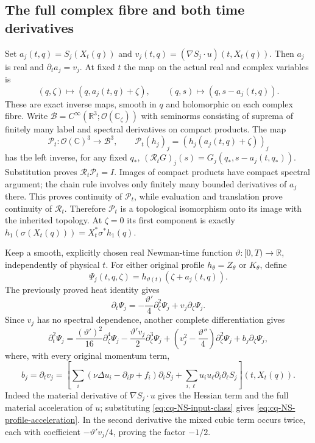 \subsection{The full complex fibre and both time derivatives}

Set $a_j(t,q)=S_j(X_t(q))$ and
$v_j(t,q)=(\nabla S_j\cdot u)(t,X_t(q))$.
Then $a_j$ is real and $\partial_ta_j=v_j$.
At fixed $t$ the map on the actual real and complex variables is
\[
 (q,\zeta)\longmapsto(q,a_j(t,q)+\zeta),\qquad
 (q,s)\longmapsto(q,s-a_j(t,q)).
\]
These are exact inverse maps, smooth in $q$ and holomorphic
on each complex fibre. Write
$\mathcal B=C^\infty(\mathbb R^3;\mathcal O(\mathbb C_\zeta))$
with seminorms consisting of suprema of finitely many label
and spectral derivatives on compact products.
The map
\[
 \mathcal P_t:\mathcal O(\mathbb C)^3\longrightarrow\mathcal B^3,
 \qquad \mathcal P_t(h_j)_j=(h_j(a_j(t,q)+\zeta))_j
\]
has the left inverse, for any fixed $q_*$,
$(\mathcal R_tG)_j(s)=G_j(q_*,s-a_j(t,q_*))$.
Substitution proves $\mathcal R_t\mathcal P_t=I$.
Images of compact products have compact spectral argument;
the chain rule involves only finitely many bounded derivatives
of $a_j$ there. This proves continuity of $\mathcal P_t$,
while evaluation and translation prove continuity of
$\mathcal R_t$. Therefore $\mathcal P_t$ is a topological
isomorphism onto its image with the inherited topology.
At $\zeta=0$ its first component is exactly
$h_1(\sigma(X_t(q)))=X_t^*\sigma^*h_1(q)$.

Keep a smooth, explicitly chosen real Newman-time function
$\vartheta:[0,T)\to\mathbb R$, independently of physical $t$.
For either original profile $h_\theta=Z_\theta$ or $K_\theta$,
define
\[
 \Psi_j(t,q,\zeta)=h_{\vartheta(t)}(\zeta+a_j(t,q)).
\]
The previously proved heat identity gives
\begin{equation}
 \partial_t\Psi_j
 =-\frac{\vartheta'}4\partial_\zeta^2\Psi_j
      +v_j\partial_\zeta\Psi_j .
 \label{eq:cq-NS-profile-generator}
\end{equation}
Since $v_j$ has no spectral dependence, another complete
differentiation gives
\begin{equation}
 \partial_t^2\Psi_j
 =\frac{(\vartheta')^2}{16}\partial_\zeta^4\Psi_j
 -\frac{\vartheta'v_j}{2}\partial_\zeta^3\Psi_j
 +\left(v_j^2-\frac{\vartheta''}{4}\right)\partial_\zeta^2\Psi_j
 +b_j\partial_\zeta\Psi_j,
 \label{eq:cq-NS-profile-second-generator}
\end{equation}
where, with every original momentum term,
\begin{equation}
 b_j=\partial_tv_j
 =\left[
 \sum_i(\nu\Delta u_i-\partial_i p+f_i)\partial_iS_j
 +\sum_{i,\ell}u_i u_\ell\partial_i\partial_\ell S_j
 \right](t,X_t(q)).
 \label{eq:cq-NS-profile-acceleration}
\end{equation}
Indeed the material derivative of $\nabla S_j\cdot u$
gives the Hessian term and the full material acceleration
of $u$; substituting \eqref{eq:cq-NS-input-class} gives
\eqref{eq:cq-NS-profile-acceleration}. In the second
derivative the mixed cubic term occurs twice, each with
coefficient $-\vartheta'v_j/4$, proving the factor $-1/2$.

